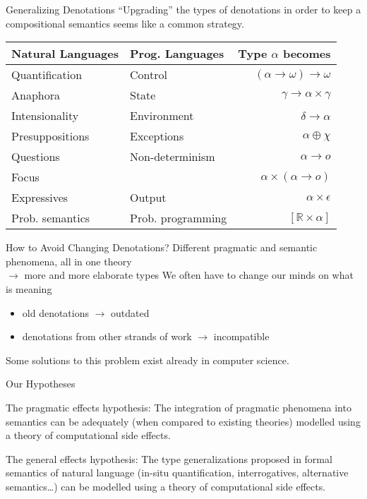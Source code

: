\documentclass{beamer}
\begin{document}
\begin{frame}{Generalizing Denotations}
  ``Upgrading'' the types of denotations in order to keep a compositional
  semantics seems like a common strategy.
  \vfill
  \begin{tabular}{llr}
    Natural Languages & Prog. Languages & Type $\alpha$ becomes \\
    \hline
    Quantification & Control &
    $(\alpha \to \omega) \to \omega$ \\
    Anaphora & State &
    $\gamma \to \alpha \times \gamma$ \\
    Intensionality & Environment &
    $\delta \to \alpha$ \\
    Presuppositions & Exceptions &
    $\alpha \oplus \chi$ \\
    Questions & Non-determinism &
    $\alpha \to o$ \\
    Focus & &
    $\alpha \times (\alpha \to o)$ \\
    Expressives & Output &
    $\alpha \times \epsilon$ \\
    Prob. semantics & Prob. programming &
    $[\mathbb{R} \times \alpha]$ \\
  \end{tabular}
\end{frame}

\begin{frame}{How to Avoid Changing Denotations?}
  Different pragmatic and semantic phenomena, all in one theory \\
    $\rightarrow$ more and more elaborate types
  \vfill
  \pause
  We often have to change our minds on what is meaning
  \begin{itemize}
  \item old denotations $\rightarrow$ outdated
  \item denotations from other strands of work $\rightarrow$ incompatible
  \end{itemize}
  \pause
  \vfill
  Some solutions to this problem exist already in computer science.
\end{frame}

\begin{frame}{Our Hypotheses}
  
  \begin{block}{The pragmatic effects hypothesis:}
  The integration of pragmatic phenomena into semantics can be adequately
  (when compared to existing theories) modelled using a theory of
  computational side effects.
  \end{block}
  \vfill
  \begin{block}{The general effects hypothesis:}
  The type generalizations proposed in formal semantics of natural language
  (in-situ quantification, interrogatives, alternative semantics\ldots) can
  be modelled using a theory of computational side effects.
  \end{block}
\end{frame}
\end{document}
